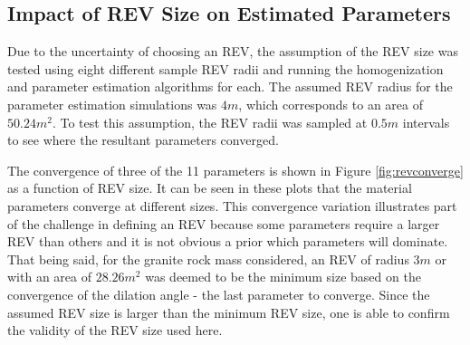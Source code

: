 \subsection{Impact of REV Size on Estimated Parameters}

Due to the uncertainty of choosing an REV, the assumption of the REV size was tested using eight different sample REV radii and running the homogenization and parameter estimation algorithms for each. The assumed REV radius for the parameter estimation simulations was $4m$, which corresponds to an area of $50.24 m^2$. To test this assumption, the REV radii was sampled at $0.5m$ intervals to see where the resultant parameters converged.

The convergence of three of the 11 parameters is shown in Figure \ref{fig:revconverge} as a function of REV size. It can be seen in these plots that the material parameters converge at different sizes. This convergence variation illustrates part of the challenge in defining an REV because some parameters require a larger REV than others and it is not obvious a prior which parameters will dominate. That being said, for the granite rock mass considered, an REV of radius $3m$ or with an area of $28.26 m^2$ was deemed to be the minimum size based on the convergence of the dilation angle - the last parameter to converge. Since the assumed REV size is larger than the minimum REV size, one is able to confirm the validity of the REV size used here.